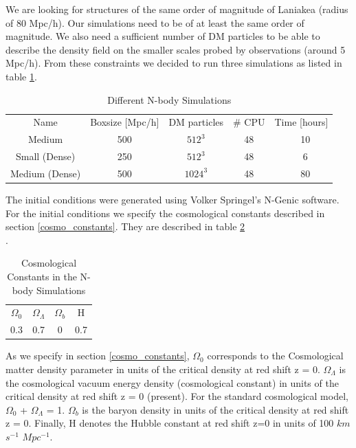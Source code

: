 \documentclass[12pt]{article}
\begin{document}
\begin{par}
We are looking for structures of the same order of
 magnitude of Laniakea (radius of 80 Mpc/h). Our simulations need to be
   of at least the same order of magnitude. We also
    need a sufficient number of DM particles to
     be able to describe the density field on the smaller scales probed by observations (around 5 Mpc/h). From these constraints we decided to run three simulations as listed in table \ref{tab:sims}. 
\end{par}
\begin{table}[ht]
    \centering
    \begin{tabular}{|c|c|c|c|c|}
        Name & Boxsize [Mpc/h] & DM particles & \# CPU & Time [hours] \\
        Medium & 500 & $512^{3}$ & 48 & ~ 10 \\
        Small (Dense) & 250 & $512^{3}$ & 48 & ~ 6  \\
        Medium (Dense) & 500 & $1024^{3}$ & 48 & ~ 80\\
    \end{tabular}
    \caption{Different N-body Simulations}
    \label{tab:sims}
\end{table}
\FloatBarrier


The initial conditions were generated using Volker
 Springel's N-Genic software. For the initial
  conditions we specify the cosmological constants
   described in section \ref{cosmo_constants}. They
    are described in table \ref{tab:consts}\\.
   
  
 \begin{table}[ht]
    \centering
    \begin{tabular}{|c|c|c|c|}
        $\Omega_0$ & $\Omega_{\Lambda}$ & $\Omega_b$ & H \\
        0.3 &  0.7 & 0 & 0.7 \\
    \end{tabular}
    \caption{Cosmological Constants in the N-body Simulations}
    \label{tab:consts}
\end{table}
\FloatBarrier

As we specify in section \ref{cosmo_constants}, $\Omega_0$  corresponds to the Cosmological matter
 density parameter in units of the critical density at
red shift z = 0. $\Omega_{\Lambda}$ is the cosmological
 vacuum energy density (cosmological constant) in
  units of the critical density at red shift z = 0 (present). 
For the standard cosmological model, $\Omega_0$ + $\Omega_{\Lambda}$ = 1.
 $\Omega_b$ is the baryon density in units
  of the critical density at red shift z = 0. Finally, H denotes the Hubble
    constant at red shift z=0 in  units of 100 
    $km$ $s^{-1}$
     $Mpc^{-1}$. 
\end{document}
